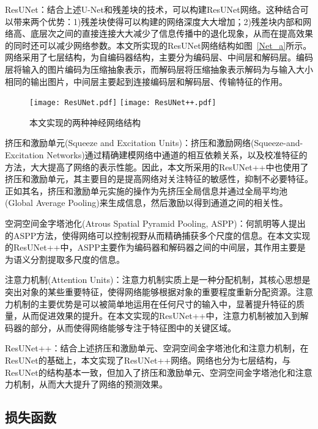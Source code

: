 ResUNet：结合上述U-Net和残差块的技术，可以构建ResUNet网络\cite{2017Road}。这种结合可以带来两个优势：1)残差块使得可以构建的网络深度大大增加；2)残差块内部和网络高、底层次之间的直接连接大大减少了信息传播中的退化现象，从而在提高效果的同时还可以减少网络参数。本文所实现的ResUNet网络结构如图~\ref{Net_a}所示。网络采用了七层结构，为自编码器结构，主要分为编码层、中间层和解码层。编码层将输入的图片编码为压缩抽象表示，而解码层将压缩抽象表示解码为与输入大小相同的输出图片，中间层主要起到连接编码层和解码层、传输特征的作用。
\begin{figure}
    \centering
      {\texttt{[image: ResUNet.pdf]}}
      {\texttt{[image: ResUNet++.pdf]}}
    \caption{本文实现的两种神经网络结构}
    \label{Net}
\end{figure}

挤压和激励单元(Squeeze and Excitation Units)：挤压和激励网络(Squeeze-and-Excitation Networks)\cite{2017Squeeze}通过精确建模网络中通道的相互依赖关系，以及校准特征的方法，大大提高了网络的表示性能。因此，本文所采用的ResUNet++中也使用了挤压和激励单元，其主要目的是提高网络对关注特征的敏感性，抑制不必要特征。正如其名，挤压和激励单元实施的操作为先挤压全局信息并通过全局平均池(Global Average Pooling)来生成信息，然后激励以得到通道之间的相关性。

空洞空间金字塔池化(Atrous Spatial Pyramid Pooling, ASPP)：何凯明等人\cite{2014Spatial}提出的ASPP方法，使得网络可以控制视野从而精确捕获多个尺度的信息。在本文实现的ResUNet++中，ASPP主要作为编码器和解码器之间的中间层，其作用主要是为语义分割提取多尺度的信息。

注意力机制(Attention Units)：注意力机制实质上是一种分配机制，其核心思想是突出对象的某些重要特征，使得网络能够根据对象的重要程度重新分配资源。注意力机制的主要优势是可以被简单地运用在任何尺寸的输入中，显著提升特征的质量，从而促进效果的提升。在本文实现的ResUNet++中，注意力机制被加入到解码器的部分，从而使得网络能够专注于特征图中的关键区域。

ResUNet++：结合上述挤压和激励单元、空洞空间金字塔池化和注意力机制，在ResUNet的基础上，本文实现了ResUNet++网络。网络也分为七层结构，与ResUNet的结构基本一致，但加入了挤压和激励单元、空洞空间金字塔池化和注意力机制，从而大大提升了网络的预测效果。

\subsection{损失函数}

